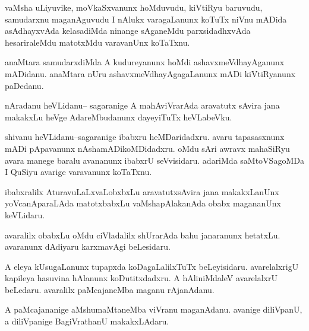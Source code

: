 \documentclass{article}
\begin{document}
\begin{mn}%
vaMsha uLiyuvike, moVkaSxvanunx hoMduvudu, kiVtiRyu baruvudu, samudarxnu maganAguvudu I 
nAlukx varagaLanunx koTuTx niVnu mADida asAdhayxvAda kelasadiMda ninange sAganeMdu 
parxsidadhxvAda hesariraleMdu matotxMdu varavanUnx koTaTxnu.
\end{mn}

\begin{mn}%
anaMtara samudarxdiMda A kudureyanunx hoMdi ashavxmeVdhayAganunx mADidanu. anaMtara nUru 
ashavxmeVdhayAgagaLanunx mADi kiVtiRyanunx paDedanu.
\end{mn}


\begin{mn}%
nAradanu heVLidanu-- sagaranige A mahAviVrarAda aravatutx sAvira jana makakxLu heVge 
AdareMbudanunx dayeyiTuTx heVLabeVku.
\end{mn}

\begin{mn}%
shivanu heVLidanu--sagaranige ibabxru heMDaridadxru. avaru tapasasxnunx mADi pApavanunx 
nAshamADikoMDidadxru. oMdu sAri awravx mahaSiRyu avara manege baralu avananunx ibabxrU 
seVvisidaru. adariMda saMtoVSagoMDa I QuSiyu avarige varavanunx koTaTxnu.
\end{mn}

\begin{mn}%
ibabxralilx AturavuLaLxvaLobxbxLu aravatutxsAvira jana makakxLanUnx yoVcanAparaLAda 
matotxbabxLu vaMshapAlakanAda obabx magananUnx keVLidaru.
\end{mn}

\begin{mn}%
avaralilx obabxLu oMdu ciVladalilx shUrarAda bahu janaranunx hetatxLu. avaranunx dAdiyaru 
karxmavAgi beLesidaru.
\end{mn}

\begin{mn}%
A eleya kUsugaLanunx tupapxda koDagaLalilxTuTx beLeyisidaru. avarelalxrigU kapileya hasuvina 
hAlanunx koDutitxdadxru. A hAliniMdaleV avarelalxrU beLedaru. avaralilx paMcajaneMba maganu 
rAjanAdanu.
\end{mn}

\begin{mn}%
A paMcajananige aMshumaMtaneMba viVranu maganAdanu. avanige diliVpanU, a diliVpanige 
BagiVrathanU makakxLAdaru.
\end{mn}
\end{document}
